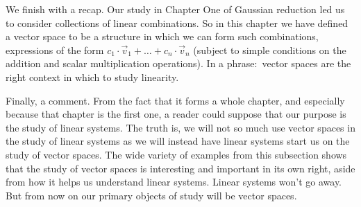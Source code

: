 We finish with a recap.
Our study in Chapter One of Gaussian reduction
led us to consider collections of linear combinations.
So in this chapter we have defined a vector space to be a 
structure in which we can form such combinations,
expressions of the form \( c_1\cdot\vec{v}_1+\dots+c_n\cdot\vec{v}_n \)
(subject to simple conditions on the addition and scalar
multiplication operations).
In a phrase:~vector spaces are
the right context in which to study linearity.

Finally, a comment.
From the fact that it forms a whole chapter, and especially because that 
chapter is the first one, a reader could suppose that our purpose
is the study of linear systems.
The truth is, we will not so much use vector spaces in
the study  of linear systems as we will instead have linear systems 
start us on the study of vector spaces.
The wide variety of examples from this subsection shows that the study of
vector spaces is interesting and important in its own right, aside from
how it helps us understand linear systems.
Linear systems won't go away.
But from now on our primary objects of study will be vector spaces.


